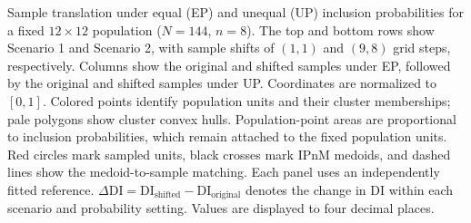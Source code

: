 \caption{Sample translation under equal (EP) and unequal (UP) inclusion probabilities for a fixed $12\times12$ population ($N=144$, $n=8$). The top and bottom rows show Scenario 1 and Scenario 2, with sample shifts of $(1,1)$ and $(9,8)$ grid steps, respectively. Columns show the original and shifted samples under EP, followed by the original and shifted samples under UP. Coordinates are normalized to $[0,1]$. Colored points identify population units and their cluster memberships; pale polygons show cluster convex hulls. Population-point areas are proportional to inclusion probabilities, which remain attached to the fixed population units. Red circles mark sampled units, black crosses mark IPnM medoids, and dashed lines show the medoid-to-sample matching. Each panel uses an independently fitted reference. $\Delta\mathrm{DI}=\mathrm{DI}_{\mathrm{shifted}}-\mathrm{DI}_{\mathrm{original}}$ denotes the change in DI within each scenario and probability setting. Values are displayed to four decimal places.}
